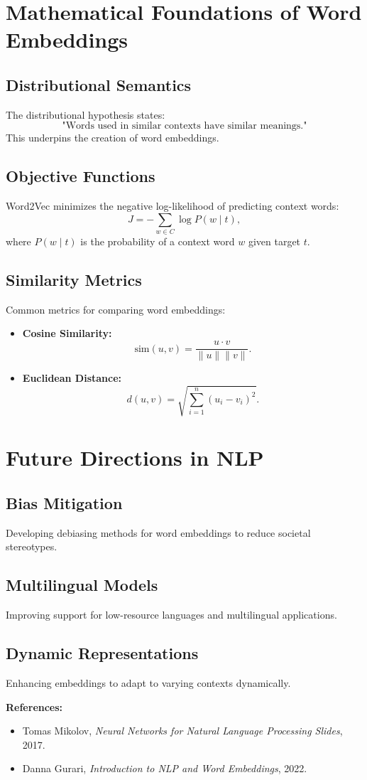 \section{Mathematical Foundations of Word Embeddings}
\subsection{Distributional Semantics}
The distributional hypothesis states:
\[
\text{"Words used in similar contexts have similar meanings."}
\]
This underpins the creation of word embeddings.

\subsection{Objective Functions}
Word2Vec minimizes the negative log-likelihood of predicting context words:
\[
J = -\sum_{w \in C} \log P(w \mid t),
\]
where \(P(w \mid t)\) is the probability of a context word \(w\) given target \(t\).

\subsection{Similarity Metrics}
Common metrics for comparing word embeddings:
\begin{itemize}
    \item \textbf{Cosine Similarity:}
    \[
    \text{sim}(u, v) = \frac{u \cdot v}{\|u\| \|v\|}.
    \]
    \item \textbf{Euclidean Distance:}
    \[
    d(u, v) = \sqrt{\sum_{i=1}^n (u_i - v_i)^2}.
    \]
\end{itemize}

\section{Future Directions in NLP}
\subsection{Bias Mitigation}
Developing debiasing methods for word embeddings to reduce societal stereotypes.

\subsection{Multilingual Models}
Improving support for low-resource languages and multilingual applications.

\subsection{Dynamic Representations}
Enhancing embeddings to adapt to varying contexts dynamically.

\textbf{References:}
\begin{itemize}
    \item Tomas Mikolov, \textit{Neural Networks for Natural Language Processing Slides}, 2017.
    \item Danna Gurari, \textit{Introduction to NLP and Word Embeddings}, 2022.
\end{itemize}

